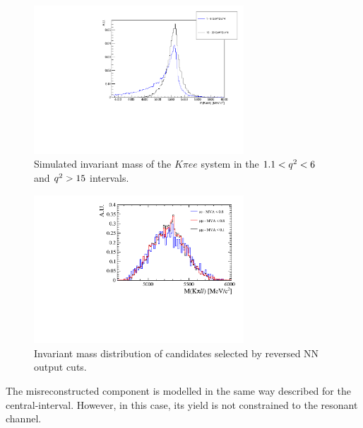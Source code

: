  \begin{figure}[h!]
\centering
\includegraphics[width=0.70\textwidth]{RKst/figs/high_central_mass_comparison.pdf}
\caption{Simulated invariant mass of the $K\pi ee$ system in the $1.1 < {q^2} < 6$ and ${q^2} > 15$ \gevgevcccc intervals.  }
\label{fig:high_central_mass_comparison}
\end{figure}

 \begin{figure}[hb!]
\centering
\includegraphics[width=0.70\textwidth]{RKst/figs/highq2_comb.pdf}
\caption{Invariant mass distribution of candidates selected by reversed NN output cuts.}
\label{fig:highq2_comb}
\end{figure}

The misreconstructed component is modelled in the same way described for the central-\qsq interval.
However, in this case, its yield is not constrained to the resonant channel.

